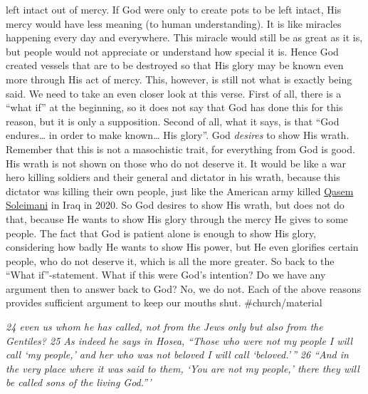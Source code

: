 left intact out of mercy. If God were only to create pots to be left
intact, His mercy would have less meaning (to human understanding). It
is like miracles happening every day and everywhere. This miracle would
still be as great as it is, but people would not appreciate or
understand how special it is. Hence God created vessels that are to be
destroyed so that His glory may be known even more through His act of
mercy. This, however, is still not what is exactly being said. We need
to take an even closer look at this verse. First of all, there is a
``what if'' at the beginning, so it does not say that God has done this
for this reason, but it is only a supposition. Second of all, what it
says, is that ``God endures\ldots{} in order to make known\ldots{} His
glory''. God \emph{desires} to show His wrath. Remember that this is not
a masochistic trait, for everything from God is good. His wrath is not
shown on those who do not deserve it. It would be like a war hero
killing soldiers and their general and dictator in his wrath, because
this dictator was killing their own people, just like the American army
killed \href{https://en.wikipedia.org/wiki/Qasem_Soleimani}{Qasem
Soleimani} in Iraq in 2020. So God desires to show His wrath, but does
not do that, because He wants to show His glory through the mercy He
gives to some people. The fact that God is patient alone is enough to
show His glory, considering how badly He wants to show His power, but He
even glorifies certain people, who do not deserve it, which is all the
more greater. So back to the ``What if''-statement. What if this were
God's intention? Do we have any argument then to answer back to God? No,
we do not. Each of the above reasons provides sufficient argument to
keep our mouths shut. \#church/material

\emph{24 even us whom he has called, not from the Jews only but also
from the Gentiles? 25 As indeed he says in Hosea,} \emph{``Those who
were not my people I will call `my people,' and her who was not
beloved I will call `beloved.'\,''} \emph{26 ``And in the very place
where it was said to them, `You are not my people,' there they
will be called sons of the living God.'''}

